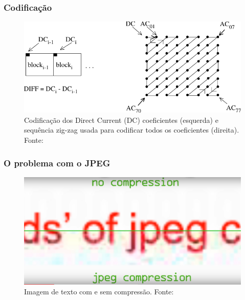 \documentclass{beamer}
\begin{document}
\begin{frame}
\frametitle{Codificação}
\begin{figure}
\includegraphics[width=\textwidth]{figs/coding_jpeg.pdf}
\caption{Codificação dos Direct Current (DC) coeficientes (esquerda) e sequência zig-zag usada para codificar todos os coeficientes (direita). Fonte:~\cite{jpeg}}
\end{figure}
\end{frame}
\begin{frame}
\frametitle{O problema com o JPEG}
\begin{figure}
\includegraphics[width=\textwidth]{figs/text_jpeg.png}
\caption{Imagem de texto com e sem compressão. Fonte:~\cite{text_jpeg}}
\end{figure}
\end{frame}
\end{document}
